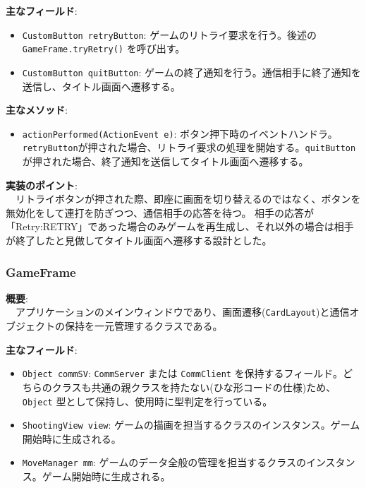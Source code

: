 \documentclass[11pt,a4j]{jarticle}
\begin{document}
\noindent\textbf{主なフィールド}:
\begin{itemize}
    \item \texttt{CustomButton retryButton}: ゲームのリトライ要求を行う。後述の\texttt{GameFrame.tryRetry()} を呼び出す。
    \item \texttt{CustomButton quitButton}: ゲームの終了通知を行う。通信相手に終了通知を送信し、タイトル画面へ遷移する。
\end{itemize}

\noindent\textbf{主なメソッド}:
\begin{itemize}
    \item \texttt{actionPerformed(ActionEvent e)}: ボタン押下時のイベントハンドラ。\texttt{retryButton}が押された場合、リトライ要求の処理を開始する。\texttt{quitButton}が押された場合、終了通知を送信してタイトル画面へ遷移する。
\end{itemize}

\noindent\textbf{実装のポイント}: \\
　リトライボタンが押された際、即座に画面を切り替えるのではなく、ボタンを無効化をして連打を防ぎつつ、通信相手の応答を待つ。
相手の応答が「Retry:RETRY」であった場合のみゲームを再生成し、それ以外の場合は相手が終了したと見做してタイトル画面へ遷移する設計とした。

\subsubsection{GameFrame}

\noindent\textbf{概要}: \\
　アプリケーションのメインウィンドウであり、画面遷移(\texttt{CardLayout})と通信オブジェクトの保持を一元管理するクラスである。

\noindent\textbf{主なフィールド}:
\begin{itemize}
    \item \texttt{Object commSV}: \texttt{CommServer} または \texttt{CommClient} を保持するフィールド。どちらのクラスも共通の親クラスを持たない(ひな形コードの仕様)ため、\texttt{Object} 型として保持し、使用時に型判定を行っている。
    \item \texttt{ShootingView view}: ゲームの描画を担当するクラスのインスタンス。ゲーム開始時に生成される。
    \item \texttt{MoveManager mm}: ゲームのデータ全般の管理を担当するクラスのインスタンス。ゲーム開始時に生成される。
\end{itemize}
\end{document}
